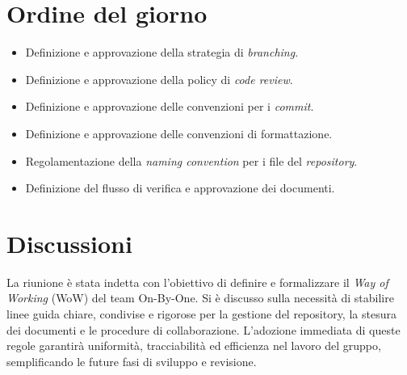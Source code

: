 \documentclass[11pt, a4paper]{article}
\begin{document}
\section{Ordine del giorno}
\begin{itemize}
    \item Definizione e approvazione della strategia di \textit{branching}.
    \item Definizione e approvazione della policy di \textit{code review}.
    \item Definizione e approvazione delle convenzioni per i \textit{commit}.
    \item Definizione e approvazione delle convenzioni di formattazione.
    \item Regolamentazione della \textit{naming convention} per i file del \textit{repository}.
    \item Definizione del flusso di verifica e approvazione dei documenti.
\end{itemize}

\section{Discussioni}
La riunione è stata indetta con l'obiettivo di definire e formalizzare il \textit{Way of Working} (WoW) del team On-By-One. Si è discusso sulla necessità di stabilire linee guida chiare, condivise e rigorose per la gestione del repository, la stesura dei documenti e le procedure di collaborazione. L'adozione immediata di queste regole garantirà uniformità, tracciabilità ed efficienza nel lavoro del gruppo, semplificando le future fasi di sviluppo e revisione.
\end{document}
